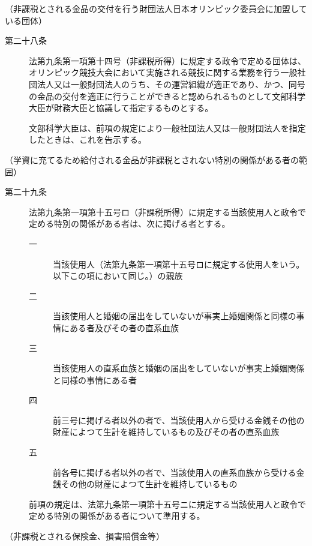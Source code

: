 \documentclass[twocolumn,a4j,10pt]{ltjtarticle}
\begin{document}
\noindent\hspace{10pt}（非課税とされる金品の交付を行う財団法人日本オリンピック委員会に加盟している団体）
\begin{description}
\item[第二十八条]法第九条第一項第十四号（非課税所得）に規定する政令で定める団体は、オリンピック競技大会において実施される競技に関する業務を行う一般社団法人又は一般財団法人のうち、その運営組織が適正であり、かつ、同号の金品の交付を適正に行うことができると認められるものとして文部科学大臣が財務大臣と協議して指定するものとする。
\item[]文部科学大臣は、前項の規定により一般社団法人又は一般財団法人を指定したときは、これを告示する。
\end{description}
\noindent\hspace{10pt}（学資に充てるため給付される金品が非課税とされない特別の関係がある者の範囲）
\begin{description}
\item[第二十九条]法第九条第一項第十五号ロ（非課税所得）に規定する当該使用人と政令で定める特別の関係がある者は、次に掲げる者とする。
\begin{description}
\item[一]当該使用人（法第九条第一項第十五号ロに規定する使用人をいう。以下この項において同じ。）の親族
\item[二]当該使用人と婚姻の届出をしていないが事実上婚姻関係と同様の事情にある者及びその者の直系血族
\item[三]当該使用人の直系血族と婚姻の届出をしていないが事実上婚姻関係と同様の事情にある者
\item[四]前三号に掲げる者以外の者で、当該使用人から受ける金銭その他の財産によつて生計を維持しているもの及びその者の直系血族
\item[五]前各号に掲げる者以外の者で、当該使用人の直系血族から受ける金銭その他の財産によつて生計を維持しているもの
\end{description}
\item[]前項の規定は、法第九条第一項第十五号ニに規定する当該使用人と政令で定める特別の関係がある者について準用する。
\end{description}
\noindent\hspace{10pt}（非課税とされる保険金、損害賠償金等）
\end{document}
